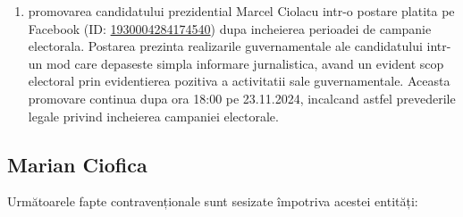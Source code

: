 \documentclass[a4paper,12pt]{article}
\begin{document}
\begin{enumerate}[leftmargin=*, label=\arabic*.)]
    \item promovarea candidatului prezidential Marcel Ciolacu intr-o postare platita pe Facebook (ID: \href{https://www.facebook.com/ads/library/?id=1930004284174540}{1930004284174540}) dupa incheierea perioadei de campanie electorala. Postarea prezinta realizarile guvernamentale ale candidatului intr-un mod care depaseste simpla informare jurnalistica, avand un evident scop electoral prin evidentierea pozitiva a activitatii sale guvernamentale. Aceasta promovare continua dupa ora 18:00 pe 23.11.2024, incalcand astfel prevederile legale privind incheierea campaniei electorale.
\end{enumerate}

\vspace{0.5cm}

\subsection{Marian Ciofica}
Următoarele fapte contravenționale sunt sesizate împotriva acestei entități:
\end{document}
